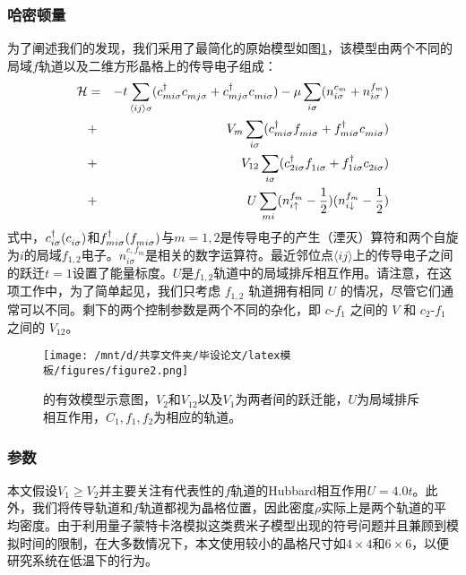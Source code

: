\subsubsection{哈密顿量}
为了阐述我们的发现，我们采用了最简化的原始模型如图\ref{fig4.1.1}，该模型由两个不同的局域$f$轨道以及二维方形晶格上的传导电子组成：
\begin{eqnarray}
    {\cal H} &=& - t \sum\limits_{\langle ij \rangle \sigma}
(c^{\dagger}_{mi\sigma}c_{mj\sigma}^{\vphantom{dagger}}
+c^{\dagger}_{mj\sigma}c_{mi\sigma}^{\vphantom{dagger}})
- \mu \sum\limits_{i\sigma} (n^{c_m}_{i\sigma}+ n^{f_m}_{i\sigma} )  \nonumber \\
&+& V_m \sum\limits_{i \sigma}  (c^{\dagger}_{mi\sigma}f_{mi\sigma}^{\vphantom{dagger}}+ f^{\dagger}_{mi\sigma}c_{mi\sigma}^{\vphantom{dagger}}) \nonumber \\
 &+& V_{12} \sum\limits_{i \sigma}  (c^{\dagger}_{2i\sigma}f_{1i\sigma}^{\vphantom{dagger}}+ f^{\dagger}_{1i\sigma}c_{2i\sigma}^{\vphantom{dagger}}) \nonumber \\
    &+& U \sum\limits_{mi} (n^{f_m}_{i\uparrow}-\frac{1}{2}) (n^{f_m}_{i\downarrow}-\frac{1}{2})
\nonumber
\end{eqnarray}
式中，$c^{\dagger}_{i\sigma}(c_{i\sigma}^{\vphantom{dagger}})$和$f^{\dagger}_{mi\sigma}(f_{mi\sigma}^{\vphantom{dagger}})$与$m=1,2$是传导电子的产生（湮灭）算符和两个自旋为$i$的局域$f_{1,2}$电子。$n^{c,f_m}_{i\sigma}$是相关的数字运算符。最近邻位点$\langle ij \rangle$上的传导电子之间的跃迁$t=1$设置了能量标度。$U$是$f_{1,2}$轨道中的局域排斥相互作用。请注意，在这项工作中，为了简单起见，我们只考虑 $f_{1,2}$ 轨道拥有相同 $U$ 的情况，尽管它们通常可以不同。剩下的两个控制参数是两个不同的杂化，即 $c$-$f_1$ 之间的 $V$ 和 $c_2$-$f_1$ 之间的 $V_{12}$。
\begin{figure}[h]
    \centering
    \texttt{[image: /mnt/d/共享文件夹/毕设论文/latex模板/figures/figure2.png]}
    \caption{的有效模型示意图，$V_2$和$V_{12}$以及$V_1$为两者间的跃迁能，$U$为局域排斥相互作用，$C_1,f_1,f_2$为相应的轨道。}
    \label{fig4.1.1}
\end{figure}

\subsubsection{参数}
本文假设$V_1 \geqslant V_2$并主要关注有代表性的$f$轨道的Hubbard相互作用$U=4.0t$。此外，我们将传导轨道和$f$轨道都视为晶格位置，因此密度$\rho$实际上是两个轨道的平均密度。由于利用量子蒙特卡洛模拟这类费米子模型出现的符号问题并且兼顾到模拟时间的限制，在大多数情况下，本文使用较小的晶格尺寸如$4 \times 4$和$6 \times 6$，以便研究系统在低温下的行为。

